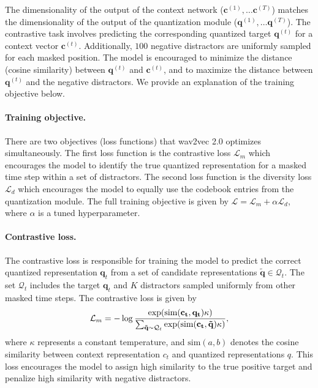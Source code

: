 The dimensionality of the output of the context network ($\mathbf{c}^{(1)}, \dots \mathbf{c}^{(T)}$) matches the dimensionality of the 
output of the quantization module ($\mathbf{q}^{(1)}, \dots \mathbf{q}^{(T)}$).
The contrastive task involves predicting the corresponding quantized target $\mathbf{q}^{(t)}$ for a context vector $\mathbf{c}^{(t)}$.
Additionally, $100$ negative distractors are uniformly sampled for each masked position.
The model is encouraged to minimize the distance (cosine similarity) between $\mathbf{q}^{(t)}$ and $\mathbf{c}^{(t)}$, and to maximize the distance between $\mathbf{q}^{(t)}$ and the negative distractors.
We provide an explanation of the training objective below.

\paragraph*{Training objective.} \label{par:obj}
There are two objectives (loss functions) that wav2vec 2.0 optimizes simultaneously.
The first loss function is the contrastive loss $\mathcal{L}_m$ which encourages the model to
identify the true quantized representation for a masked time step within a set of distractors. 
The second loss function is the diversity loss $\mathcal{L}_d$ which encourages the model 
to equally use the codebook entries from the quantization module.
The full training objective is given by $\mathcal{L} = \mathcal{L}_m + \alpha \mathcal{L}_d$, where $\alpha$ is a tuned hyperparameter.

\paragraph*{Contrastive loss.}
The contrastive loss is responsible for training the model to predict the correct quantized 
representation $\mathbf{q}_t$ from a set of candidate representations $\mathbf{\tilde{q}} \in \mathcal{Q}_t$. 
The set $\mathcal{Q}_t$ includes the target $\mathbf{q}_t$ and $K$ distractors sampled uniformly from other masked time steps. 
The contrastive loss is given by
\begin{equation}
    \mathcal{L}_m = -\log \dfrac{\exp(\text{sim}(\mathbf{c_t}, \mathbf{q_t}) \/ \kappa)}{\sum_{\mathbf{\tilde{q}} \sim \mathcal{Q}_t} \exp(\text{sim}(\mathbf{c_t}, \mathbf{\tilde{q}}) \/ \kappa)},
\end{equation}
where $\kappa$ represents a constant temperature, and $\text{sim}(a, b)$ denotes the cosine similarity between 
context representation $c_t$ and quantized representations $q$. 
This loss encourages the model to assign high similarity to the true 
positive target and penalize high similarity with negative distractors.

